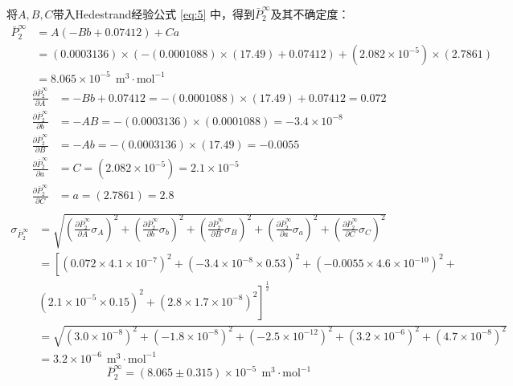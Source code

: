 \documentclass[cn,hazy,pku,12pt,normal,math=newtx,cite=super]{elegantnote}
\begin{document}
将$A,B,C$带入Hedestrand经验公式 \eqref{eq:5} 中，得到$\bar{P}_2^\infty$及其不确定度：
\begin{align*}
\bar{P}_2^\infty &=A \left(- B b + 0.07412\right) + C a \\
&=\left(0.0003136\right) \times \left(- \left(0.0001088\right) \times \left(17.49\right) + 0.07412\right) + \left(2.082 \times 10^{-5}\right) \times \left(2.7861\right)\\
&=8.065 \times 10^{-5}\ \mathrm{~m^3\cdot mol^{-1}}
\end{align*}
\begin{equation*}
\begin{aligned}
\frac{\partial \bar{P}_2^\infty }{\partial A }&=- B b + 0.07412=- \left(0.0001088\right) \times \left(17.49\right) + 0.07412=0.072\\    
\frac{\partial \bar{P}_2^\infty }{\partial b }&=- A B=- \left(0.0003136\right) \times \left(0.0001088\right)=-3.4 \times 10^{-8}\\
\frac{\partial \bar{P}_2^\infty }{\partial B }&=- A b=- \left(0.0003136\right) \times \left(17.49\right)=-0.0055\\
\frac{\partial \bar{P}_2^\infty }{\partial a }&=C=\left(2.082 \times 10^{-5}\right)=2.1 \times 10^{-5}\\
\frac{\partial \bar{P}_2^\infty }{\partial C }&=a=\left(2.7861\right)=2.8\\
\end{aligned}
\end{equation*}
\begin{equation*}
\begin{aligned}
\sigma_{\bar{P}_2^\infty}&=\sqrt{\left(\frac{\partial \bar{P}_2^\infty }{\partial A } \sigma_{A}\right)^2+\left(\frac{\partial \bar{P}_2^\infty }{\partial b } \sigma_{b}\right)^2+\left(\frac{\partial \bar{P}_2^\infty }{\partial B } \sigma_{B}\right)^2+\left(\frac{\partial \bar{P}_2^\infty }{\partial a } \sigma_{a}\right)^2+\left(\frac{\partial \bar{P}_2^\infty }{\partial C } \sigma_{C}\right)^2}\\
&=\left[\left(0.072 \times 4.1 \times 10^{-7}\right)^2+\left(-3.4 \times 10^{-8} \times 0.53\right)^2+\left(-0.0055 \times 4.6 \times 10^{-10}\right)^2+\right.\\
&\left.\left(2.1 \times 10^{-5} \times 0.15\right)^2+\left(2.8 \times 1.7 \times 10^{-8}\right)^2\right]^{\frac12}\\   
&=\sqrt{\left(3.0 \times 10^{-8}\right)^2+\left(-1.8 \times 10^{-8}\right)^2+\left(-2.5 \times 10^{-12}\right)^2+\left(3.2 \times 10^{-6}\right)^2+\left(4.7 \times 10^{-8}\right)^2}\\   
&=3.2 \times 10^{-6}\ \mathrm{~m^3\cdot mol^{-1}}
\end{aligned}
\end{equation*}
\begin{equation*}
\bar{P}_2^\infty= (8.065  \pm 0.315) \times 10^{-5} \ \mathrm{~m^3\cdot mol^{-1}}
\end{equation*}
\end{document}
